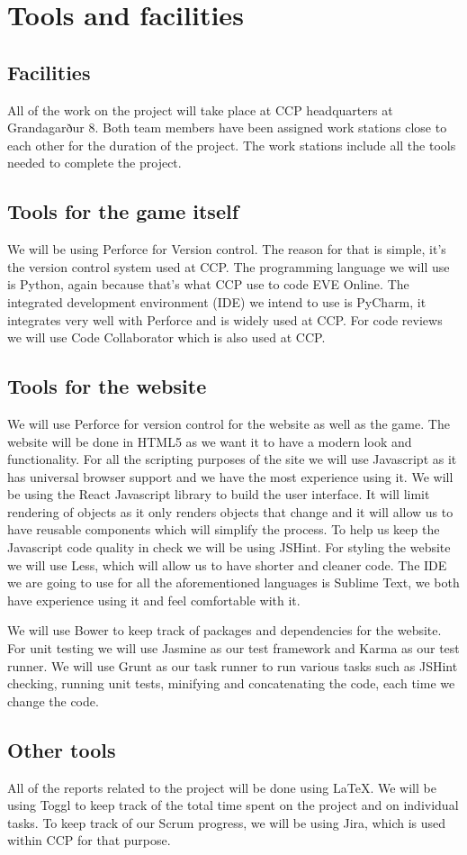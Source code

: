 \section{Tools and facilities}\label{tools}

\subsection{Facilities}
All of the work on the project will take place at CCP headquarters at Grandagarður 8. Both team members have been assigned work stations close to each other for the duration of the project. The work stations include all the tools needed to complete the project. 

\subsection{Tools for the game itself}
We will be using Perforce for Version control. The reason for that is simple, it's the version control system used at CCP. The programming language we will use is Python, again because that's what CCP use to code EVE Online. The integrated development environment (IDE) we intend to use is PyCharm, it integrates very well with Perforce and is widely used at CCP. For code reviews we will use Code Collaborator which is also used at CCP.

\subsection{Tools for the website}
We will use Perforce for version control for the website as well as the game. The website will be done in HTML5 as we want it to have a modern look and functionality. For all the scripting purposes of the site we will use Javascript as it has universal browser support and we have the most experience using it. We will be using the React Javascript library to build the user interface. It will limit rendering of objects as it only renders objects that change and it will allow us to have reusable components which will simplify the process. To help us keep the Javascript code quality in check we will be using JSHint. For styling the website we will use Less, which will allow us to have shorter and cleaner code. The IDE we are going to use for all the aforementioned languages is Sublime Text, we both have experience using it and feel comfortable with it. 

We will use Bower to keep track of packages and dependencies for the website. For unit testing we will use Jasmine as our test framework and Karma as our test runner. We will use Grunt as our task runner to run various tasks such as JSHint checking, running unit tests, minifying and concatenating the code, each time we change the code.

\subsection{Other tools}

All of the reports related to the project will be done using \LaTeX. We will be using Toggl to keep track of the total time spent on the project and on individual tasks. To keep track of our Scrum progress, we will be using Jira, which is used within CCP for that purpose.